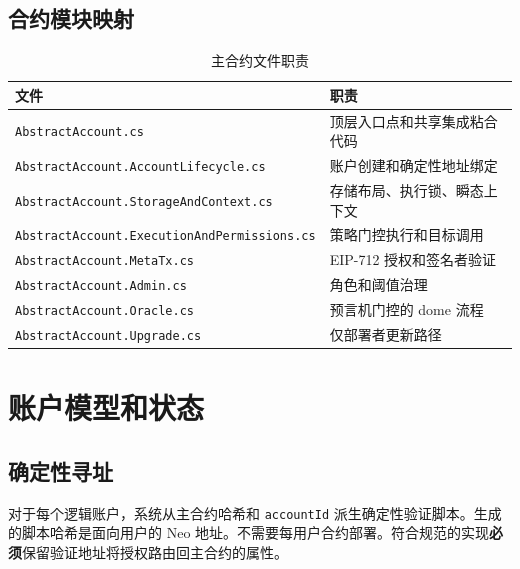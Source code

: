 \documentclass[11pt]{article}
\newcommand{\code}[1]{\texttt{#1}}
\newcommand{\must}{\textbf{必须}}
\begin{document}
\subsection{合约模块映射}
\begin{table}[h!]
  \centering
  \caption{主合约文件职责}
  \begin{tabularx}{\textwidth}{>{\raggedright\arraybackslash}p{}X}
    \toprule
    文件 & 职责 \\
    \midrule
    \code{AbstractAccount.cs} & 顶层入口点和共享集成粘合代码 \\
    \code{AbstractAccount.AccountLifecycle.cs} & 账户创建和确定性地址绑定 \\
    \code{AbstractAccount.StorageAndContext.cs} & 存储布局、执行锁、瞬态上下文 \\
    \code{AbstractAccount.ExecutionAndPermissions.cs} & 策略门控执行和目标调用 \\
    \code{AbstractAccount.MetaTx.cs} & EIP-712 授权和签名者验证 \\
    \code{AbstractAccount.Admin.cs} & 角色和阈值治理 \\
    \code{AbstractAccount.Oracle.cs} & 预言机门控的 dome 流程 \\
    \code{AbstractAccount.Upgrade.cs} & 仅部署者更新路径 \\
    \bottomrule
  \end{tabularx}
\end{table}

\section{账户模型和状态}
\subsection{确定性寻址}
对于每个逻辑账户，系统从主合约哈希和 \code{accountId} 派生确定性验证脚本。生成的脚本哈希是面向用户的 Neo 地址。不需要每用户合约部署。符合规范的实现\must{}保留验证地址将授权路由回主合约的属性。
\end{document}
